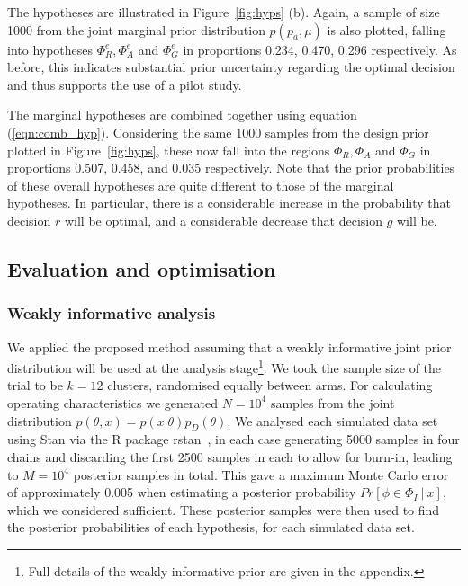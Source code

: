 \documentclass{article} %
\begin{document}
The hypotheses are illustrated in Figure~\ref{fig:hyps} (b). Again, a sample of size 1000 from the joint marginal prior distribution $p(p_{a}, \mu)$ is also plotted, falling into hypotheses $\Phi^e_R, \Phi^e_A$ and $\Phi^e_G$ in proportions 0.234, 0.470, 0.296 respectively. As before, this indicates substantial prior uncertainty regarding the optimal decision and thus supports the use of a pilot study.

The marginal hypotheses are combined together using equation (\ref{eqn:comb_hyp}). Considering the same 1000 samples from the design prior plotted in Figure~\ref{fig:hyps}, these now fall into the regions $\Phi_R, \Phi_A$ and $\Phi_G$ in proportions 0.507, 0.458, and 0.035 respectively. Note that the prior probabilities of these overall hypotheses are quite different to those of the marginal hypotheses. In particular, there is a considerable increase in the probability that decision $r$ will be optimal, and a considerable decrease that decision $g$ will be.

\subsection{Evaluation and optimisation}

\subsubsection{Weakly informative analysis}

We applied the proposed method assuming that a weakly informative joint prior distribution will be used at the analysis stage\footnote{Full details of the weakly informative prior are given in the appendix.}. We took the sample size of the trial to be $k = 12$ clusters, randomised equally between arms. For calculating operating characteristics we generated $N = 10^4$ samples from the joint distribution $p(\theta, x) = p(x | \theta)p_D(\theta)$. We analysed each simulated data set using Stan via the R package rstan~\cite{rstan}, in each case generating 5000 samples in four chains and discarding the first 2500 samples in each to allow for burn-in, leading to $M = 10^4$ posterior samples in total. This gave a maximum Monte Carlo error of approximately 0.005 when estimating a posterior probability $Pr[\phi \in \Phi_I ~|~ x]$, which we considered sufficient. These posterior samples were then used to find the posterior probabilities of each hypothesis, for each simulated data set.

\end{document}
